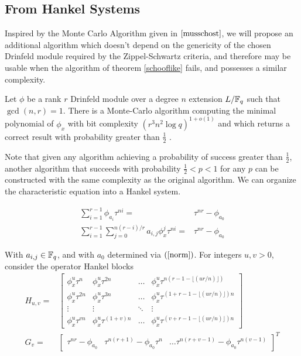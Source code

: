 




\subsection{From Hankel Systems}
Inspired by the Monte Carlo Algorithm given in $\cite{musschost}$, we will propose an additional algorithm which doesn't depend on the genericity of the chosen Drinfeld module required by the Zippel-Schwartz criteria, and therefore may be usable when the algorithm of theorem \ref{schooflike} fails, and possesses a similar complexity.
\begin{theorem}\label{hankel}
Let $\phi$ be a rank $r$ Drinfeld module over a degree $n$ extension $L/\mathbb{F}_q$ such that $\gcd(n, r) = 1$. There is a Monte-Carlo algorithm computing the minimal polynomial of $\phi_x$ with bit complexity $(r^{3}n^2 \log q)^{1+o(1)}$ and which returns a correct result with probability greater than $\frac{1}{2}$ .
\end{theorem}

Note that given any algorithm achieving a probability of success greater than $\frac{1}{2}$, another algorithm that succeeds with probability $\frac{1}{2} < p < 1$ for any $p$ can be constructed with the same complexity as the original algorithm. We can organize the characteristic equation into a Hankel system.

\begin{align*}
\sum_{i=1}^{r - 1} \phi_{a_i}\tau^{ni} = &  \tau^{nr} - \phi_{a_0}
\\
\sum_{i=1}^{r - 1} \sum_{j=0}^{n(r-i)/r}a_{i,j}\phi_{x}^j\tau^{ni} = & \tau^{nr} - \phi_{a_0}
\end{align*}

With $a_{i,j} \in \mathbb{F}_q$, and with $a_0$ determined via $(\ref{norm})$. For integers $u, v > 0$, consider the operator Hankel blocks
\begin{align*}
H_{u,v} = & \begin{bmatrix}
\phi_x^u\tau^{n} & \phi_x^u\tau^{2n} & \ldots & \phi_x^u\tau^{n (r - 1 - \lfloor(ur/n) \rfloor)} \\
\phi_x^u\tau^{2n} & \phi_x^u\tau^{3n} & \ldots & \phi_x^u\tau^{(1 + r - 1 - \lfloor(ur/n) \rfloor)n} \\ \vdots & \vdots & \ddots & \vdots \\ \phi_x^u\tau^{vn} & \phi_x^u\tau^{(1+v)n} & \ldots & \phi_x^u\tau^{(v +  r - 1 - \lfloor(ur/n) \rfloor) n}
\end{bmatrix}
\\
    G_{v} = &\begin{bmatrix}
    \tau^{nr} - \phi_{a_0} & \tau^{n(r+1)} - \phi_{a_0}\tau^n & \ldots \tau^{n(r+v -1)} - \phi_{a_0}\tau^{n(v-1)}
    \end{bmatrix}^T
\end{align*}


